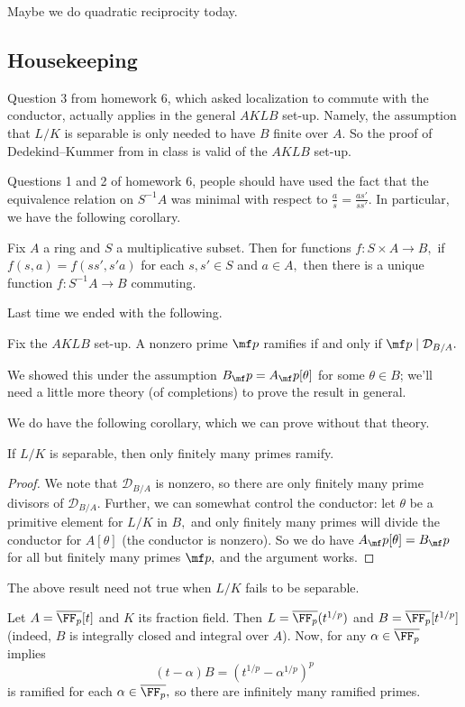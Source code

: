 













Maybe we do quadratic reciprocity today.

\subsection{Housekeeping}
Question 3 from homework 6, which asked localization to commute with the conductor, actually applies in the general $AKLB$ set-up. Namely, the assumption that $L/K$ is separable is only needed to have $B$ finite over $A.$ So the proof of Dedekind--Kummer from in class is valid of the $AKLB$ set-up.

Questions 1 and 2 of homework 6, people should have used the fact that the equivalence relation on $S^{-1}A$ was minimal with respect to $\frac as=\frac{as'}{ss'}.$ In particular, we have the following corollary.
\begin{corollary}
	Fix $A$ a ring and $S$ a multiplicative subset. Then for functions $f:S\times A\to B,$ if $f(s,a)=f(ss',s'a)$ for each $s,s'\in S$ and $a\in A,$ then there is a unique function $f:S^{-1}A\to B$ commuting.
\end{corollary}

Last time we ended with the following.
\begin{proposition}
	Fix the $AKLB$ set-up. A nonzero prime $\mf p$ ramifies if and only if $\mf p\mid\mathcal D_{B/A}.$
\end{proposition}
We showed this under the assumption $B_\mf p=A_\mf p[\theta]$ for some $\theta\in B$; we'll need a little more theory (of completions) to prove the result in general.

We do have the following corollary, which we can prove without that theory.
\begin{proposition}
	If $L/K$ is separable, then only finitely many primes ramify.
\end{proposition}
\begin{proof}
	We note that $\mathcal D_{B/A}$ is nonzero, so there are only finitely many prime divisors of $\mathcal D_{B/A}.$ Further, we can somewhat control the conductor: let $\theta$ be a primitive element for $L/K$ in $B,$ and only finitely many primes will divide the conductor for $A[\theta]$ (the conductor is nonzero). So we do have $A_\mf p[\theta]=B_\mf p$ for all but finitely many primes $\mf p,$ and the argument works.
\end{proof}
The above result need not true when $L/K$ fails to be separable.
\begin{nex}
	Let $A=\overline{\FF_p}[t]$ and $K$ its fraction field. Then $L=\overline{\FF_p}(t^{1/p})$ and $B=\overline{\FF_p}[t^{1/p}]$ (indeed, $B$ is integrally closed and integral over $A$). Now, for any $\alpha\in\overline{\FF_p}$ implies
	\[(t-\alpha)B=(t^{1/p}-\alpha^{1/p})^p\]
	is ramified for each $\alpha\in\overline{\FF_p},$ so there are infinitely many ramified primes.
\end{nex}

